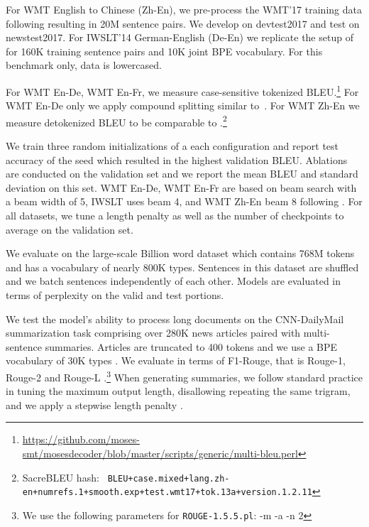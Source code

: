 \documentclass{article} \usepackage{iclr2019_conference,times}
\def\gbw{Billion word}
\def\cnndm{CNN-DailyMail}
\def\iwslt{IWSLT}
\def\ende{WMT En-De}
\def\enfr{WMT En-Fr}
\def\zhen{WMT Zh-En}
\begin{document}
For WMT English to Chinese (Zh-En), we pre-process the WMT'17 training data following \citet{hassan2018parity} resulting in 20M sentence pairs. 
We develop on devtest2017 and test on newstest2017. 
For IWSLT'14 German-English (De-En) we replicate the setup of \citet{edunov2018classical} for 160K training sentence pairs and 10K joint BPE vocabulary.
For this benchmark only, data is lowercased.

For \ende{}, \enfr{}, we measure case-sensitive tokenized BLEU.\footnote{\scriptsize{\url{https://github.com/moses-smt/mosesdecoder/blob/master/scripts/generic/multi-bleu.perl}}}
For \ende{} only we apply compound splitting similar to~\citet{vaswani2017transformer}.
For \zhen{} we measure detokenized BLEU to be comparable to \citet{hassan2018parity}.\footnote{SacreBLEU hash: \texttt{\scriptsize
BLEU+case.mixed+lang.zh-en+numrefs.1+smooth.exp+test.wmt17+tok.13a+version.1.2.11}}

We train three random initializations of a each configuration and report test accuracy of the seed which resulted in the highest validation BLEU. 
Ablations are conducted on the validation set and we report the mean BLEU and standard deviation on this set.
\ende{}, \enfr{} are based on beam search with a beam width of 5, \iwslt{} uses beam 4, and \zhen{} beam 8 following \citet{hassan2018parity}.
For all datasets, we tune a length penalty as well as the number of checkpoints to average on the validation set.

We evaluate on the large-scale \gbw{} dataset \citep{chelba2013one} which contains 768M tokens and has a vocabulary of nearly 800K types. 
Sentences in this dataset are shuffled and we batch sentences independently of each other.
Models are evaluated in terms of perplexity on the valid and test portions.

We test the model's ability to process long documents on the \cnndm{} summarization task \citep{hermann15,nallapati16} comprising over 280K news articles paired with multi-sentence summaries. 
Articles are truncated to 400 tokens \citep{see17} and we use a BPE vocabulary of 30K types \citep{fan17}. 
We evaluate in terms of F1-Rouge, that is Rouge-1, Rouge-2 and Rouge-L \citep{lin04}.\footnote{We use the following parameters for \texttt{ROUGE-1.5.5.pl}: -m -a -n 2}
When generating summaries, we follow standard practice in tuning the maximum output length, disallowing repeating the same trigram, and we apply a stepwise length penalty \citep{paulus17intra,fan17,wu2016google}. 
\end{document}
